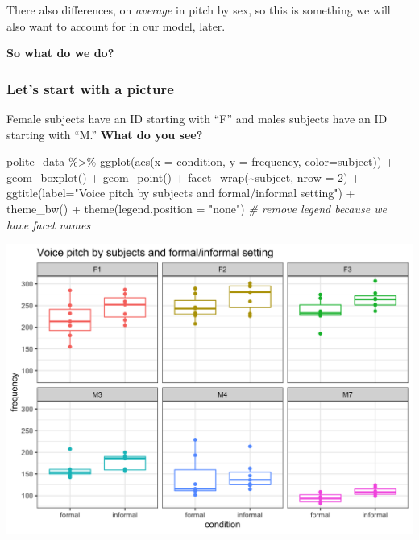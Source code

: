 \documentclass[
  openany]{book}
\newenvironment{Shaded}{\begin{snugshade}}{\end{snugshade}}
\newcommand{\AttributeTok}[1]{\textcolor[rgb]{0.77,0.63,0.00}{#1}}
\newcommand{\CommentTok}[1]{\textcolor[rgb]{0.56,0.35,0.01}{\textit{#1}}}
\newcommand{\DecValTok}[1]{\textcolor[rgb]{0.00,0.00,0.81}{#1}}
\newcommand{\FunctionTok}[1]{\textcolor[rgb]{0.00,0.00,0.00}{#1}}
\newcommand{\NormalTok}[1]{#1}
\newcommand{\SpecialCharTok}[1]{\textcolor[rgb]{0.00,0.00,0.00}{#1}}
\newcommand{\StringTok}[1]{\textcolor[rgb]{0.31,0.60,0.02}{#1}}
\begin{document}
There also differences, on \emph{average} in pitch by sex, so this is something we will also want to account for in our model, later.

\textbf{So what do we do?}

\hypertarget{lets-start-with-a-picture}{%
\subsubsection{Let's start with a picture}\label{lets-start-with-a-picture}}

Female subjects have an ID starting with ``F'' and males subjects have an ID starting with ``M.'' \textbf{What do you see?}

\begin{Shaded}
\begin{Highlighting}[]
\NormalTok{polite\_data }\SpecialCharTok{\%\textgreater{}\%} 
  \FunctionTok{ggplot}\NormalTok{(}\FunctionTok{aes}\NormalTok{(}\AttributeTok{x =}\NormalTok{ condition, }
             \AttributeTok{y =}\NormalTok{ frequency,}
             \AttributeTok{color=}\NormalTok{subject)) }\SpecialCharTok{+}
  \FunctionTok{geom\_boxplot}\NormalTok{() }\SpecialCharTok{+} 
  \FunctionTok{geom\_point}\NormalTok{() }\SpecialCharTok{+}
  \FunctionTok{facet\_wrap}\NormalTok{(}\SpecialCharTok{\textasciitilde{}}\NormalTok{subject, }\AttributeTok{nrow =} \DecValTok{2}\NormalTok{) }\SpecialCharTok{+}
  \FunctionTok{ggtitle}\NormalTok{(}\AttributeTok{label=}\StringTok{"Voice pitch by subjects and formal/informal setting"}\NormalTok{) }\SpecialCharTok{+}
  \FunctionTok{theme\_bw}\NormalTok{() }\SpecialCharTok{+}
  \FunctionTok{theme}\NormalTok{(}\AttributeTok{legend.position =} \StringTok{"none"}\NormalTok{) }\CommentTok{\# remove legend because we have facet names}
\end{Highlighting}
\end{Shaded}

\includegraphics[width=1\linewidth]{images/m3/explore}
\end{document}
